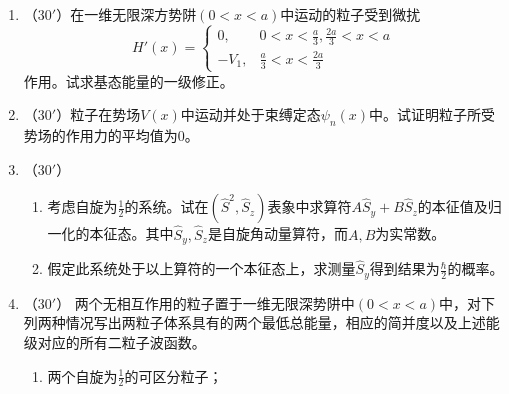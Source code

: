 
\begin{enumerate}
	\item
（$30'$）在一维无限深方势阱$(0<x<a)$中运动的粒子受到微扰
$$H'(x)=\begin{cases}0,&0<x<\frac{a}{3},\frac{2a}{3}<x<a\\
-V_1,&\frac{a}{3}<x<\frac{2a}{3}\end{cases}$$
作用。试求基态能量的一级修正。


\banswer{
	
}


\item 
（$30'$）粒子在势场$V(x)$中运动并处于束缚定态$\psi_n(x)$中。试证明粒子所受势场的作用力的平均值为$ 0  $。


\banswer{
	
}


\item 
（$30'$）
\begin{enumerate}
	\item
考虑自旋为$\frac{1}{2}$的系统。试在$(\hat{S}^2,\hat{S}_z)$表象中求算符$A\hat{S}_y+B\hat{S}_z$的本征值及归一化的本征态。其中$\hat{S}_y,\hat{S}_z$是自旋角动量算符，而$A,B$为实常数。

\item 
假定此系统处于以上算符的一个本征态上，求测量$\hat{S}_y$得到结果为$\frac{\hbar}{2}$的概率。
\end{enumerate}


\banswer{
	
}


\newpage
\item 
（$30'$）
两个无相互作用的粒子置于一维无限深势阱中$(0<x<a)$中，对下列两种情况写出两粒子体系具有的两个最低总能量，相应的简并度以及上述能级对应的所有二粒子波函数。
\begin{enumerate}
	\item
两个自旋为$\frac{1}{2}$的可区分粒子；


\end{enumerate}
\end{enumerate}
